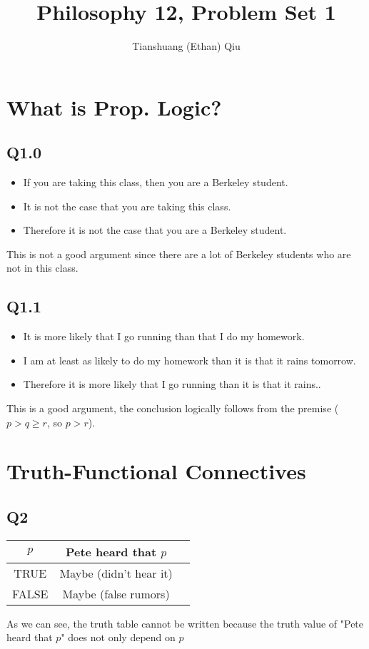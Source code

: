 \documentclass[12pt]{article}
\author{Tianshuang (Ethan) Qiu}
\begin{document}
\title{Philosophy 12, Problem Set 1}
\maketitle
\newpage

\section{What is Prop. Logic?}
\subsection{Q1.0}
\begin{itemize}
    \item If you are taking this class, then you are a Berkeley student.
    \item It is not the case that you are taking this class.
    \item Therefore it is not the case that you are a Berkeley student.
\end{itemize}
This is not a good argument since there are a lot of Berkeley students who 
are not in this class.

\subsection{Q1.1}
\begin{itemize}
    \item It is more likely that I go running than that I do my homework.
    \item I am at least as likely to do my homework than it is that it rains tomorrow.
    \item Therefore it is more likely that I go running than it is that it rains..
\end{itemize}
This is a good argument, the conclusion logically follows from the premise ($p > q \geq r$, so $p > r$).

\section{Truth-Functional Connectives}
\subsection{Q2}

\begin{tabular}{ | c | c | c |}
    \hline
    $p$ & Pete heard that $p$ \\
    \hline
    TRUE & Maybe (didn't hear it) \\
    \hline
    FALSE & Maybe (false rumors) \\
    \hline
\end{tabular}
\newline
As we can see, the truth table cannot be written because the truth value of 
"Pete heard that $p$" does not only depend on $p$
    
\end{document}
